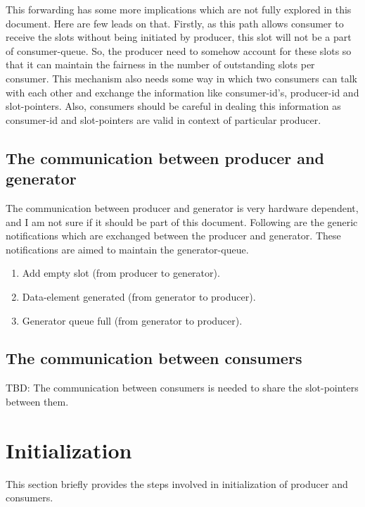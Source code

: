 \documentclass[a4paper,twoside]{report} %
\begin{document}
\begin{enumerate}
  This forwarding has some more implications which are not fully
  explored in this document.  Here are few leads on that.  Firstly,
  as this path allows consumer to receive the slots without being
  initiated by producer, this slot will not be a part of
  consumer-queue.  So, the producer need to somehow account for these
  slots so that it can maintain the fairness in the number of
  outstanding slots per consumer.  This mechanism also needs some way
  in which two consumers can talk with each other and exchange the 
  information like consumer-id's, producer-id and slot-pointers.
  Also, consumers should be careful in dealing this information as
  consumer-id and slot-pointers are valid in context of particular
  producer.
\end{enumerate} 


\subsection{The communication between producer and generator}
The communication between producer and generator is very
hardware dependent, and I am not sure if it should be part of this
document.  Following are the generic notifications which are exchanged
between the producer and generator.  These notifications are aimed to
maintain the generator-queue.

\begin{enumerate} 
  \item Add empty slot (from producer to generator). 
  \item Data-element generated (from generator to producer).
  \item Generator queue full (from generator to producer).
\end{enumerate} 

\subsection{The communication between consumers}
TBD:  The communication between consumers is needed to share the
slot-pointers between them.

\section{Initialization}
\label{sec:initialization}
This section briefly provides the steps involved in initialization of
producer and consumers.
\end{document}
